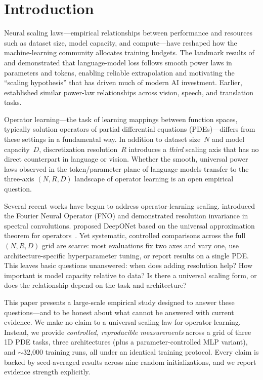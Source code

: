 \documentclass[11pt]{article}
\begin{document}
\section{Introduction}
\label{sec:intro}

Neural scaling laws---empirical relationships between performance and
resources such as dataset size, model capacity, and compute---have
reshaped how the machine-learning community allocates training budgets.
The landmark results of \citet{kaplan2020scaling} and
\citet{hoffmann2022training} demonstrated that language-model loss
follows smooth power laws in parameters and tokens, enabling reliable
extrapolation and motivating the ``scaling hypothesis'' that has driven
much of modern AI investment.
Earlier, \citet{hestness2017deep} established similar power-law
relationships across vision, speech, and translation tasks.

Operator learning---the task of learning mappings between function
spaces, typically solution operators of partial differential equations
(PDEs)---differs from these settings in a fundamental way.
In addition to dataset size~$N$ and model capacity~$D$, discretization
resolution~$R$ introduces a \emph{third} scaling axis that has no
direct counterpart in language or vision.
Whether the smooth, universal power laws observed in the token/parameter
plane of language models transfer to the three-axis
$(N, R, D)$ landscape of operator learning is an open empirical
question.

Several recent works have begun to address operator-learning scaling.
\citet{li2021fourier} introduced the Fourier Neural Operator (FNO) and
demonstrated resolution invariance in spectral convolutions.
\citet{lu2021learning} proposed DeepONet based on the universal
approximation theorem for operators~\citep{chen1995universal}.
Yet systematic, controlled comparisons across the full $(N, R, D)$ grid
are scarce: most evaluations fix two axes and vary one, use
architecture-specific hyperparameter tuning, or report results on a
single PDE.
This leaves basic questions unanswered: when does adding resolution
help? How important is model capacity relative to data? Is there a
universal scaling form, or does the relationship depend on the task
and architecture?

This paper presents a large-scale empirical study designed to answer
these questions---and to be honest about what cannot be answered with
current evidence.
We make no claim to a universal scaling law for operator learning.
Instead, we provide \emph{controlled, reproducible measurements} across
a grid of three 1D PDE tasks, three architectures (plus a
parameter-controlled MLP variant), and $\sim$32{,}000 training runs,
all under an identical training protocol.
Every claim is backed by seed-averaged results across nine
random initializations, and we report evidence strength explicitly.
\end{document}
